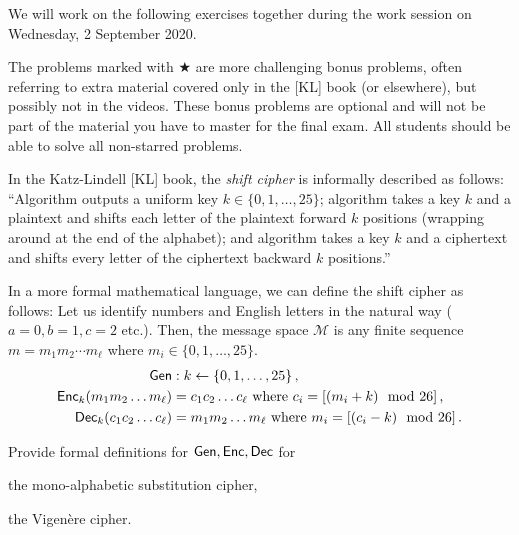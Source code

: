 \documentclass[a4paper,10pt,landscape,twocolumn]{scrartcl}
\begin{document}
\problems

{\sffamily\noindent
We will work on the following exercises together during the work session on Wednesday, 2 September 2020.

The problems marked with $\bigstar$ are more challenging bonus problems, often referring to extra material covered only in the [KL] book (or elsewhere), but possibly not in the videos. These bonus problems are optional and will not be part of the material you have to master for the final exam. All students should be able to solve all non-starred problems.
}

\begin{exercise}
In the Katz-Lindell [KL] book, the \emph{shift cipher} is informally described as follows: ``Algorithm \gen outputs a uniform key $k \in \{0,1,\ldots, 25\}$; algorithm \enc takes a key $k$ and a plaintext and shifts each letter of the plaintext forward $k$ positions (wrapping around at the end of the alphabet); and algorithm \dec takes a key $k$ and a ciphertext and shifts every letter of the ciphertext backward $k$ positions.''

In a more formal mathematical language, we can define the shift cipher as follows: Let us identify numbers and English letters in the natural way ($a=0, b=1, c=2$ etc.). Then, the message space $\mathcal{M}$ is any finite sequence $m=m_1 m_2 \cdots m_\ell$ where $m_i \in \{0,1,\ldots,25\}$.
\begin{align*}
\mathsf{Gen}&: k \leftarrow \{0,1,\ldots, 25\} \, ,\\
\mathsf{Enc}_k(m_1 m_2 \ldots m_\ell) &= c_1 c_2 \ldots c_\ell  \mbox{ where }c_i = [(m_i + k) \mod 26] \, ,\\
\mathsf{Dec}_k(c_1 c_2 \ldots c_\ell) &= m_1 m_2 \ldots m_\ell  \mbox{ where }m_i = [(c_i - k) \mod 26] \, .
\end{align*}

Provide formal definitions for $\mathsf{Gen}, \mathsf{Enc}, \mathsf{Dec}$ for
\begin{subex}
the mono-alphabetic substitution cipher,
\end{subex}
\begin{subex}
the Vigen{\`e}re cipher.
\end{subex}
\end{exercise}
\end{document}
